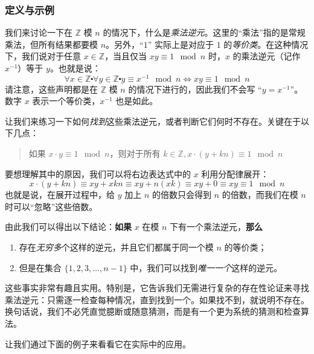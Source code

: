 \subsubsection*{定义与示例}

我们来讨论一下在 $\mathbb{Z}$ 模 $n$ 的情况下，什么是\emph{乘法逆元}。这里的``乘法''指的是常规乘法，但所有结果都要模 $n$。另外，``$1$'' 实际上是对应于 $1$ 的\emph{等价类}。在这种情况下，我们说对于任意 $x \in \mathbb{Z}$，当且仅当 $xy \equiv 1 \mod n$ 时，$x$ 的乘法逆元（记作 $x^{-1}$）等于 $y$。也就是说：
\[\forall x \in \mathbb{Z} \centerdot \forall y \in \mathbb{Z} \centerdot y \equiv x^{-1} \mod n \iff xy \equiv 1 \mod n\]
请注意，这些声明都是在 $\mathbb{Z}$ 模 $n$ 的情况下进行的，因此我们不会写 ``$y = x^{-1}$''。数字 $x$ 表示一个等价类，$x^{-1}$ 也是如此。

让我们来练习一下如何\emph{找到}这些乘法逆元，或者判断它们何时不存在。关键在于以下几点：
\begin{quotation}
    如果 $x \cdot y \equiv 1 \mod n$，则对于所有 $k \in \mathbb{Z}, x \cdot (y+kn) \equiv 1 \mod n$
\end{quotation}
要想理解其中的原因，我们可以将右边表达式中的 $x$ 利用分配律展开：
\[x \cdot (y+kn) \equiv xy+xkn \equiv xy+n(xk) \equiv xy+0 \equiv xy \equiv 1 \mod n\]
也就是说，在展开过程中，给 $y$ 加上 $n$ 的倍数只会得到 $n$ 的倍数，而我们在模 $n$ 时可以``忽略''这些倍数。

由此我们可以得出以下结论：\textbf{如果} $x$ 在模 $n$ 下有一个乘法逆元，\textbf{那么} 
\begin{enumerate}[label=(\alph*)]
    \item 存在\emph{无穷多}个这样的逆元，并且它们都属于同一个模 $n$ 的等价类；
    \item 但是在集合 $\{1, 2, 3, \dots , n-1\}$ 中，我们可以找到\emph{唯一一个}这样的逆元。
\end{enumerate}

这些事实非常有趣且实用。特别是，它告诉我们无需进行复杂的存在性论证来寻找乘法逆元：只需逐一检查每种情况，直到找到一个。如果找不到，就说明不存在。换句话说，我们不必凭直觉臆断或随意猜测，而是有一个更为系统的猜测和检查算法。

让我们通过下面的例子来看看它在实际中的应用。\\

